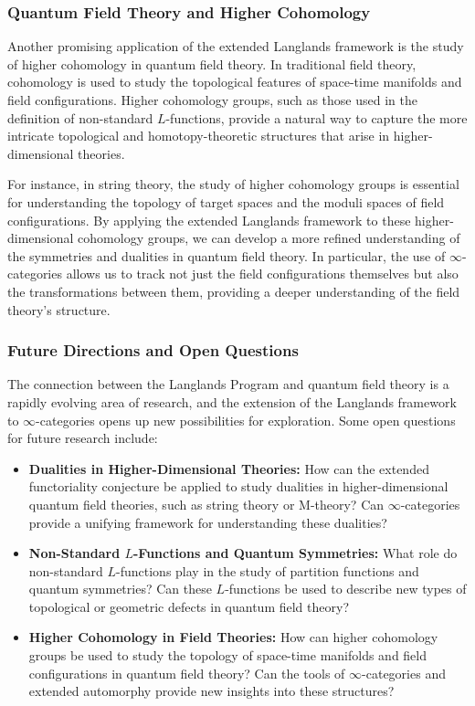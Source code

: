 \documentclass{article}
\theoremstyle{remark}
\begin{document}
\subsubsection{Quantum Field Theory and Higher Cohomology}

Another promising application of the extended Langlands framework is the study of higher cohomology in quantum field theory. In traditional field theory, cohomology is used to study the topological features of space-time manifolds and field configurations. Higher cohomology groups, such as those used in the definition of non-standard $L$-functions, provide a natural way to capture the more intricate topological and homotopy-theoretic structures that arise in higher-dimensional theories.

For instance, in string theory, the study of higher cohomology groups is essential for understanding the topology of target spaces and the moduli spaces of field configurations. By applying the extended Langlands framework to these higher-dimensional cohomology groups, we can develop a more refined understanding of the symmetries and dualities in quantum field theory. In particular, the use of $\infty$-categories allows us to track not just the field configurations themselves but also the transformations between them, providing a deeper understanding of the field theory's structure.

\subsubsection{Future Directions and Open Questions}

The connection between the Langlands Program and quantum field theory is a rapidly evolving area of research, and the extension of the Langlands framework to $\infty$-categories opens up new possibilities for exploration. Some open questions for future research include:
\begin{itemize}
    \item \textbf{Dualities in Higher-Dimensional Theories:} How can the extended functoriality conjecture be applied to study dualities in higher-dimensional quantum field theories, such as string theory or M-theory? Can $\infty$-categories provide a unifying framework for understanding these dualities?
    \item \textbf{Non-Standard $L$-Functions and Quantum Symmetries:} What role do non-standard $L$-functions play in the study of partition functions and quantum symmetries? Can these $L$-functions be used to describe new types of topological or geometric defects in quantum field theory?
    \item \textbf{Higher Cohomology in Field Theories:} How can higher cohomology groups be used to study the topology of space-time manifolds and field configurations in quantum field theory? Can the tools of $\infty$-categories and extended automorphy provide new insights into these structures?
\end{itemize}
\end{document}
